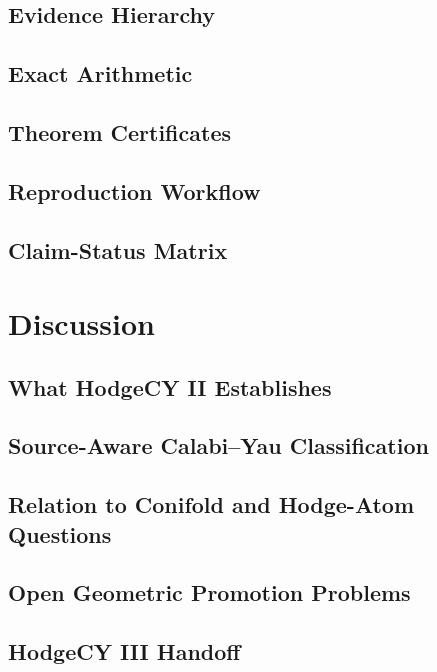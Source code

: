 \subsection{Evidence Hierarchy}

\subsection{Exact Arithmetic}

\subsection{Theorem Certificates}

\subsection{Reproduction Workflow}

\subsection{Claim-Status Matrix}

\section{Discussion}\label{sec:discussion}


\subsection{What HodgeCY II Establishes}

\subsection{Source-Aware Calabi--Yau Classification}

\subsection{Relation to Conifold and Hodge-Atom Questions}

\subsection{Open Geometric Promotion Problems}

\subsection{HodgeCY III Handoff}



